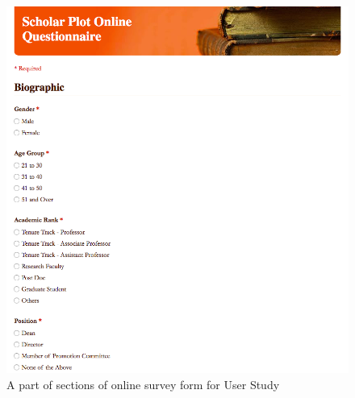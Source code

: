  \begin{figure}
  \centering
  \includegraphics[width=\columnwidth]{figures/fig_survey_form}
  \caption{A part of sections of online survey form for User Study}
  \label{fig:SurveyForm} 
\end{figure}

